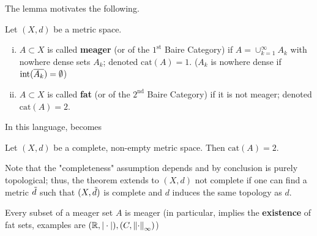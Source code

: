\documentclass{article}
\begin{document}
\begin{flushleft}
The lemma motivates the following.  
\end{flushleft}


\begin{definition}  
    Let $(X,d)$ be a metric space.  
    \begin{enumerate}[i)]
    \item $A \subset X$ is called \textbf{meager} (or of the $1^{\textrm{st}}$ Baire Category) if $A = \cup_{k=1}^{\infty} A_k$ with nowhere dense sets $A_k$; denoted $\textrm{cat}(A)=1$. ($A_k$ is nowhere dense if $\textrm{int}(\overline{A_k})=\emptyset$)
    \item $A \subset X$ is called \textbf{fat} (or of the $2^{\textrm{nd}}$ Baire Category) if it is not meager; denoted $\textrm{cat}(A)=2$.  
\end{enumerate} 
\end{definition} 

In this language,  becomes  

\begin{theorem}
\nl
\label{baire category}
Let  $(X,d)$ be a complete, non-empty metric space. Then $\textrm{cat}(A)=2$.  
\end{theorem}  
Note that the "completeness" assumption depends and by conclusion is purely topological; thus, the theorem extends to $(X,d)$ not complete if one can find a metric $\Tilde{d}$ such that $(X, \Tilde{d})$ is complete and $d$ induces the same topology as $d$.

\begin{remark}
    Every subset of a meager set $A$ is meager (in particular,  implies the \textbf{existence} of fat sets, examples are $(\mathbb{R}, |\cdot|), (C, \left\|{\cdot}\right\|_{\infty})$)
\end{remark}
\end{document}

